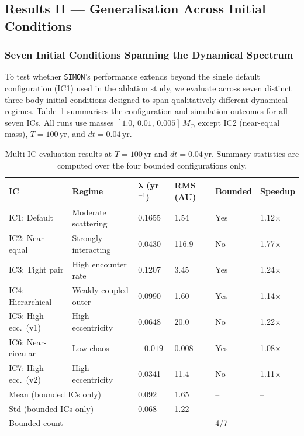 \documentclass[12pt]{article}
\begin{document}

\subsection{Results II --- Generalisation Across Initial Conditions}
\label{sec:generalisation}

\subsubsection{Seven Initial Conditions Spanning the Dynamical Spectrum}

To test whether \texttt{SIMON}'s performance extends beyond the single default
configuration (IC1) used in the ablation study, we evaluate across seven distinct
three-body initial conditions designed to span qualitatively different dynamical
regimes. Table~\ref{tab:multi_ic} summarises the configuration and simulation outcomes
for all seven ICs. All runs use masses $[1.0,\,0.01,\,0.005]\,M_\odot$ except IC2
(near-equal mass), $T = 100$\,yr, and $dt = 0.04$\,yr.

\begin{table}[H]
\centering
\caption{Multi-IC evaluation results at $T=100$\,yr and $dt=0.04$\,yr. Summary statistics are computed over the four bounded configurations only.}
\label{tab:multi_ic}
\begin{tabular}{@{}llllll@{}}
\toprule
\textbf{IC} & \textbf{Regime} & $\boldsymbol{\lambda}$ (yr$^{-1}$) & \textbf{RMS (AU)} & \textbf{Bounded} & \textbf{Speedup} \\
\midrule
IC1: Default & Moderate scattering & 0.1655 & 1.54 & Yes & 1.12$\times$ \\
IC2: Near-equal & Strongly interacting & 0.0430 & 116.9 & No & 1.77$\times$ \\
IC3: Tight pair & High encounter rate & 0.1207 & 3.45 & Yes & 1.24$\times$ \\
IC4: Hierarchical & Weakly coupled outer & 0.0990 & 1.60 & Yes & 1.14$\times$ \\
IC5: High ecc.\ (v1) & High eccentricity & 0.0648 & 20.0 & No & 1.22$\times$ \\
IC6: Near-circular & Low chaos & $-0.019$ & 0.008 & Yes & 1.08$\times$ \\
IC7: High ecc.\ (v2) & High eccentricity & 0.0341 & 11.4 & No & 1.11$\times$ \\
\midrule
\multicolumn{2}{l}{Mean (bounded ICs only)} & 0.092 & 1.65 & -- & -- \\
\multicolumn{2}{l}{Std (bounded ICs only)} & 0.068 & 1.22 & -- & -- \\
\multicolumn{2}{l}{Bounded count} & -- & -- & 4/7 & -- \\
\bottomrule
\end{tabular}
\end{table}
\end{document}
